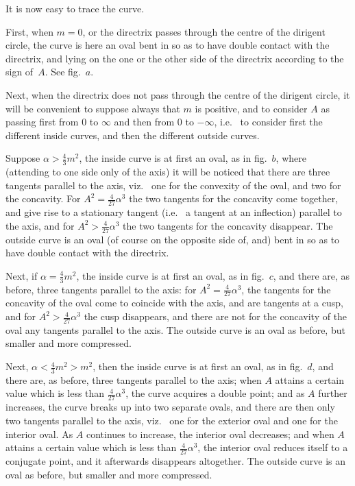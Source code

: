 \documentclass[12pt,a4paper]{article}
\theoremstyle{definition}
\newcommand{\viz}{viz.\ }
\newcommand{\ie}{i.e.\ }
\begin{document}
It is now easy to trace the curve.

First, when $m = 0$, or the directrix passes through the centre
of the dirigent circle, the curve is here an oval bent in so as
to have double contact with the directrix, and lying on the one
or the other side of the directrix according to the sign of~$A$.
See fig.~$a$.

Next, when the directrix does not pass through the centre of
the dirigent circle, it will be convenient to suppose always that
$m$ is positive, and to consider $A$ as passing first from $0$ to $\infty$
and then from $0$ to $-\infty$, \ie{} to consider first the different
inside curves, and then the different outside curves.

Suppose $\alpha > \tfrac{4}{3}m^{2}$, the inside curve is at first an oval,
as in fig.~$b$, where (attending to one side only of the axis)
it will be noticed that there are three tangents parallel to the
axis, \viz{} one for the convexity of the oval, and two for the concavity.
For $A^{2} = \tfrac{4}{27}\alpha^{3}$ the two tangents for the concavity come
together, and give rise to a stationary tangent (\ie{} a tangent
at an inflection) parallel to the axis, and for $A^{2} > \tfrac{4}{27}\alpha^{3}$
the two tangents for the concavity disappear.
The outside curve is an oval (of course on the opposite side
of, and) bent in so as to have double contact with the directrix.

Next, if $\alpha = \tfrac{4}{3}m^{2}$, the inside curve is at first an oval,
as in fig.~$c$, and there are, as before, three tangents parallel
to the axis: for $A^{2} = \tfrac{4}{27}\alpha^{3}$, the tangents for the concavity
of the oval come to coincide with the axis, and are tangents
at a cusp, and for $A^{2} > \tfrac{4}{27}\alpha^{3}$ the cusp disappears, and
there are not for the concavity of the oval any tangents
parallel to the axis.
The outside curve is an oval as before, but smaller and more compressed.

Next, $\alpha < \tfrac{4}{3}m^{2} > m^{2}$, then the inside curve is at first
an oval, as in fig.~$d$, and there are, as before, three tangents
parallel to the axis; when $A$ attains a certain value which is
less than $\tfrac{4}{27}\alpha^{3}$, the curve acquires a double point; and
as $A$ further increases, the curve breaks up into two separate
ovals, and there are then only two tangents parallel to the axis,
\viz{} one for the exterior oval and one for the interior oval.
As $A$ continues to increase, the interior oval decreases; and
when $A$ attains a certain value which is less than $\tfrac{4}{27}\alpha^{3}$,
the interior oval reduces itself to a conjugate point, and it
afterwards disappears altogether.
The outside curve is an oval as before, but smaller and more compressed.
\end{document}
